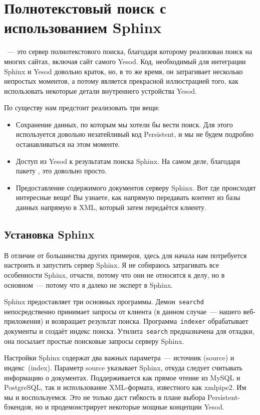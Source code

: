 \chapter{Полнотекстовый поиск с использованием Sphinx}\label{chap:sphinx}
~--- это сервер полнотекстового поиска, благодаря которому реализован поиск на многих сайтах, включая сайт самого Yesod. Код, необходимый для интеграции Sphinx и Yesod довольно краток, но, в то же время, он затрагивает несколько непростых моментов, а потому является прекрасной иллюстрацией того, как использовать некоторые детали внутреннего устройства Yesod.

По существу нам предстоит реализовать три вещи:
\begin{itemize}
  \item Сохранение данных, по которым мы хотели бы вести поиск. Для этого используется довольно незатейливый код Persistent, и мы не будем подробно останавливаться на этом моменте.
  \item Доступ из Yesod к результатам поиска Sphinx. На самом деле, благодаря пакету , это довольно просто.
  \item Предоставление содержимого документов серверу Sphinx. Вот где происходят интересные вещи! Вы узнаете, как напрямую передавать контент из базы данных напрямую в XML, который затем передаётся клиенту.
\end{itemize}

\section{Установка Sphinx}
В отличие от большинства других примеров, здесь для начала нам потребуется настроить и запустить сервер Sphinx. Я не собираюсь затрагивать все особенности Sphinx, отчасти, потому что они не относятся к делу, но в основном~--- потому что я далеко не эксперт в Sphinx.

Sphinx предоставляет три основных программы. Демон~\lstinline!searchd! непосредственно принимает запросы от клиента (в данном случае~--- нашего веб-приложения) и возвращает результат поиска. Программа~\lstinline!indexer! обрабатывает документы и создаёт индекс поиска. Утилита~\lstinline!search! предназначена для отладки, она посылает простые поисковые запросы серверу Sphinx.

Настройки Sphinx содержат два важных параметра~--- источник (source) и индекс~(index). Параметр source указывает Sphinx, откуда следует считывать информацию о документах. Поддерживается как прямое чтение из MySQL и PostgreSQL, так и использование XML-формата, известного как xmlpipe2. Им мы и воспользуемся. Это не только даст гибкость в плане выбора Persistent-бэкендов, но и продемонстрирует некоторые мощные концепции Yesod.

